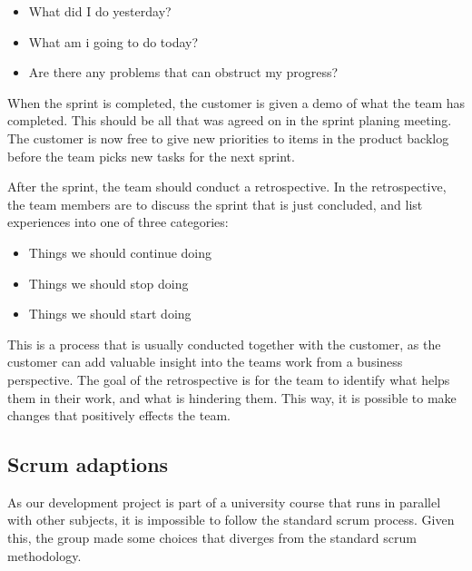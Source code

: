 \documentclass[11pt,a4paper,titlepage,oneside]{report}
\begin{document}
\begin{itemize}
\item What did I do yesterday?
\item What am i going to do today?
\item Are there any problems that can obstruct my progress?
\end {itemize} 

When the sprint is completed, the customer is given a demo of what the team has completed. This should be all that was agreed on in the sprint planing meeting. The customer is now free to give new priorities to items in the product backlog before the team picks new tasks for the next sprint. 

After the sprint, the team should conduct a retrospective. In the retrospective, the team members are to discuss the sprint that is just concluded, and list experiences into one of three categories:

\begin{itemize}
\item Things we should continue doing
\item Things we should stop doing
\item Things we should start doing
\end {itemize} 

This is a process that is usually conducted together with the customer, as the customer can add valuable insight into the teams work from a business perspective. The goal of the retrospective is for the team to identify what helps them in their work, and what is hindering them. This way, it is possible to make changes that positively effects the team.

\subsection{Scrum adaptions}
\label{subsec:scrumadaptations}
As our development project is part of a university course that runs in parallel with other subjects, it is impossible to follow the standard scrum process. Given this, the group made some choices that diverges from the standard scrum methodology.
\end{document}
